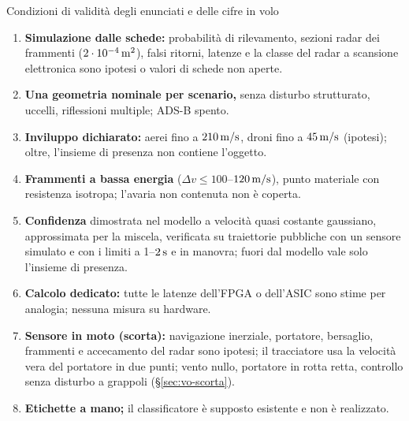 \begin{riquadro}{Condizioni di validità degli enunciati e delle cifre in volo}
\begin{enumerate}[label=\arabic*.,itemsep=1pt]
\item \textbf{Simulazione dalle schede:} probabilità di rilevamento, sezioni radar dei frammenti ($2\cdot10^{-4}\,\mathrm{m^2}$), falsi ritorni, latenze e la classe del radar a scansione elettronica sono ipotesi o valori di schede non aperte.
\item \textbf{Una geometria nominale per scenario,} senza disturbo strutturato, uccelli, riflessioni multiple; ADS-B spento.
\item \textbf{Inviluppo dichiarato:} aerei fino a $210\,\mathrm{m/s}$, droni fino a $45\,\mathrm{m/s}$ (ipotesi); oltre, l'insieme di presenza non contiene l'oggetto.
\item \textbf{Frammenti a bassa energia} ($\Delta v\le100$--$120\,\mathrm{m/s}$), punto materiale con resistenza isotropa; l'avaria non contenuta non è coperta.
\item \textbf{Confidenza} dimostrata nel modello a velocità quasi costante gaussiano, approssimata per la miscela, verificata su traiettorie pubbliche con un sensore simulato e con i limiti a 1--$2\,\mathrm{s}$ e in manovra; fuori dal modello vale solo l'insieme di presenza.
\item \textbf{Calcolo dedicato:} tutte le latenze dell'FPGA o dell'ASIC sono stime per analogia; nessuna misura su hardware.
\item \textbf{Sensore in moto (scorta):} navigazione inerziale, portatore, bersaglio, frammenti e accecamento del radar sono ipotesi; il tracciatore usa la velocità vera del portatore in due punti; vento nullo, portatore in rotta retta, controllo senza disturbo a grappoli (\S\ref{sec:vo-scorta}).
\item \textbf{Etichette a mano;} il classificatore è supposto esistente e non è realizzato.
\end{enumerate}
\end{riquadro}
